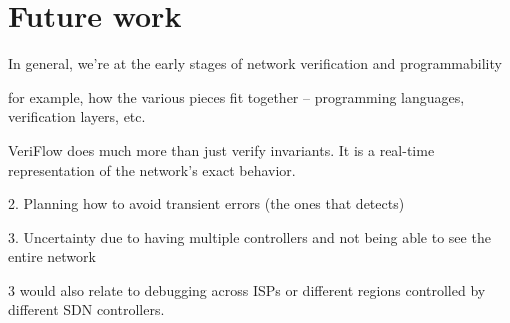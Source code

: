 \section{Future work}
\label{sec:future}

In general, we're at the early stages of network verification and programmability

for example, how the various pieces fit together -- programming languages, verification layers, etc.

VeriFlow does much more than just verify invariants.  It is a real-time representation of the network's exact behavior.  

  2. Planning how to avoid transient errors (the ones that detects)

  3. Uncertainty due to having multiple controllers and not being able to see the entire network

  3 would also relate to debugging across ISPs or different regions controlled by different SDN controllers.
